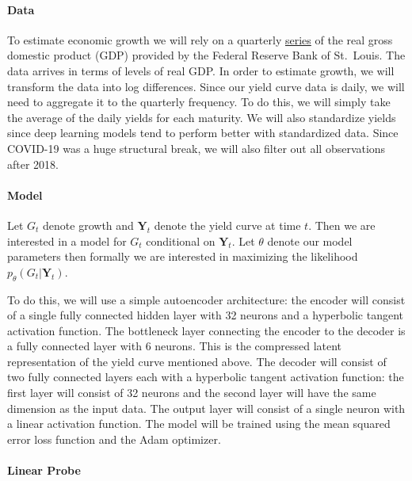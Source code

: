 \documentclass{article}
\theoremstyle{plain}
\theoremstyle{definition}
\theoremstyle{remark}
\begin{document}
\paragraph{Data}\label{data}

To estimate economic growth we will rely on a quarterly
\href{https://fred.stlouisfed.org/series/GDPC1}{series} of the real
gross domestic product (GDP) provided by the Federal Reserve Bank of
St.~Louis. The data arrives in terms of levels of real GDP. In order to
estimate growth, we will transform the data into log differences. Since
our yield curve data is daily, we will need to aggregate it to the
quarterly frequency. To do this, we will simply take the average of the
daily yields for each maturity. We will also standardize yields since
deep learning models tend to perform better with standardized data.
Since COVID-19 was a huge structural break, we will also filter out all
observations after 2018.

\paragraph{Model}\label{model}

Let \(G_t\) denote growth and \(\mathbf{Y}_t\) denote the yield curve at
time \(t\). Then we are interested in a model for \(G_t\) conditional on
\(\mathbf{Y}_t\). Let \(\theta\) denote our model parameters then
formally we are interested in maximizing the likelihood
\(p_{\theta}(G_t|\mathbf{Y}_t)\). 

To do this, we will use a simple
autoencoder architecture: the encoder will consist of a single fully
connected hidden layer with 32 neurons and a hyperbolic tangent
activation function. The bottleneck layer connecting the encoder to the
decoder is a fully connected layer with 6 neurons. This is the
compressed latent representation of the yield curve mentioned above. The
decoder will consist of two fully connected layers each with a
hyperbolic tangent activation function: the first layer will consist of
32 neurons and the second layer will have the same dimension as the
input data. The output layer will consist of a single neuron with a
linear activation function. The model will be trained using the mean
squared error loss function and the Adam optimizer.

\paragraph{Linear Probe}\label{linear-probe}
\end{document}
